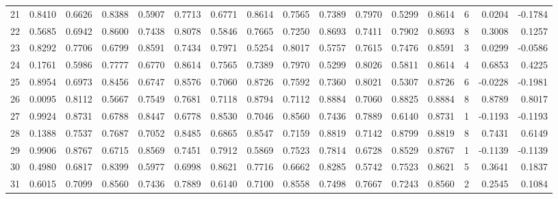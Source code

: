 \begin{tabular}{lrrrrrrrrrrrrrrr}
21  &      0.8410 &  0.6626 &  0.8388 &  0.5907 &  0.7713 &  0.6771 &  0.8614 &  0.7565 &  0.7389 &  0.7970 &   0.5299 &     0.8614 &      6 &                    0.0204 &                    -0.1784 \\
22  &      0.5685 &  0.6942 &  0.8600 &  0.7438 &  0.8078 &  0.5846 &  0.7665 &  0.7250 &  0.8693 &  0.7411 &   0.7902 &     0.8693 &      8 &                    0.3008 &                     0.1257 \\
23  &      0.8292 &  0.7706 &  0.6799 &  0.8591 &  0.7434 &  0.7971 &  0.5254 &  0.8017 &  0.5757 &  0.7615 &   0.7476 &     0.8591 &      3 &                    0.0299 &                    -0.0586 \\
24  &      0.1761 &  0.5986 &  0.7777 &  0.6770 &  0.8614 &  0.7565 &  0.7389 &  0.7970 &  0.5299 &  0.8026 &   0.5811 &     0.8614 &      4 &                    0.6853 &                     0.4225 \\
25  &      0.8954 &  0.6973 &  0.8456 &  0.6747 &  0.8576 &  0.7060 &  0.8726 &  0.7592 &  0.7360 &  0.8021 &   0.5307 &     0.8726 &      6 &                   -0.0228 &                    -0.1981 \\
26  &      0.0095 &  0.8112 &  0.5667 &  0.7549 &  0.7681 &  0.7118 &  0.8794 &  0.7112 &  0.8884 &  0.7060 &   0.8825 &     0.8884 &      8 &                    0.8789 &                     0.8017 \\
27  &      0.9924 &  0.8731 &  0.6788 &  0.8447 &  0.6778 &  0.8530 &  0.7046 &  0.8560 &  0.7436 &  0.7889 &   0.6140 &     0.8731 &      1 &                   -0.1193 &                    -0.1193 \\
28  &      0.1388 &  0.7537 &  0.7687 &  0.7052 &  0.8485 &  0.6865 &  0.8547 &  0.7159 &  0.8819 &  0.7142 &   0.8799 &     0.8819 &      8 &                    0.7431 &                     0.6149 \\
29  &      0.9906 &  0.8767 &  0.6715 &  0.8569 &  0.7451 &  0.7912 &  0.5869 &  0.7523 &  0.7814 &  0.6728 &   0.8529 &     0.8767 &      1 &                   -0.1139 &                    -0.1139 \\
30  &      0.4980 &  0.6817 &  0.8399 &  0.5977 &  0.6998 &  0.8621 &  0.7716 &  0.6662 &  0.8285 &  0.5742 &   0.7523 &     0.8621 &      5 &                    0.3641 &                     0.1837 \\
31  &      0.6015 &  0.7099 &  0.8560 &  0.7436 &  0.7889 &  0.6140 &  0.7100 &  0.8558 &  0.7498 &  0.7667 &   0.7243 &     0.8560 &      2 &                    0.2545 &                     0.1084 \\

\end{tabular}
